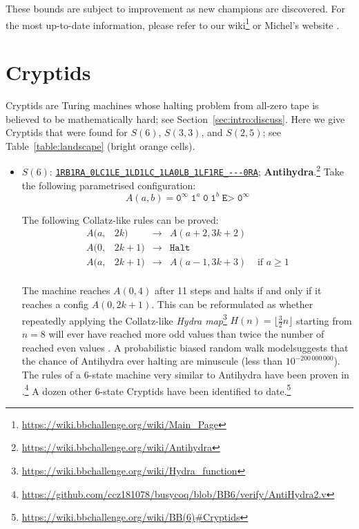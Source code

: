 \documentclass[letterpaper,british,11pt]{article}
\theoremstyle{definition} %
\numberwithin{equation}{section}
\theoremstyle{definition} %
\newcommand{\tm}[1]{\href{https://bbchallenge.org/#1}{\texttt{\nolinkurl{#1}}}}
\newcommand{\szero}{\texttt{0}\xspace}
\newcommand{\sone}{\texttt{1}\xspace}
\begin{document}
These bounds are subject to improvement as new champions are discovered. For the most up-to-date information, please refer to our wiki\footnote{\url{https://wiki.bbchallenge.org/wiki/Main_Page}} or Michel’s website \cite{PMichel_website}.


\section{Cryptids}\label{app:cryptids}

Cryptids are Turing machines whose halting problem from all-zero tape is believed to be mathematically hard; see Section~\ref{sec:intro:discuss}. Here we give Cryptids that were found for $S(6)$, $S(3,3)$, and $S(2,5)$; see Table~\ref{table:landscape} (bright orange cells).

\begin{itemize}
    \item $S(6)$: \tm{1RB1RA_0LC1LE_1LD1LC_1LA0LB_1LF1RE_---0RA}; \textbf{Antihydra}.\footnote{\label{note:antihydra}\url{https://wiki.bbchallenge.org/wiki/Antihydra}} Take the following parametrised configuration:
          $$ A(a,b) = \szero^\infty \; \sone^a \; \szero \; \sone^b \; \texttt{E>} \; \szero^\infty$$

          The following Collatz-like rules can be proved:
          \[
              \begin{array}{llcll}
                  A(a, & 2k)   & \longrightarrow & A(a+2, 3k+2)                         \\
                  A(0, & 2k+1) & \longrightarrow & \texttt{Halt}                        \\
                  A(a, & 2k+1) & \longrightarrow & A(a-1, 3k+3)  & \text{ if } a \geq 1 \\
              \end{array}
          \]

          The machine reaches $A(0,4)$ after 11 steps and halts if and only if it reaches a config $A(0,2k+1)$. This can be reformulated as whether repeatedly applying the Collatz-like \textit{Hydra map}\footnote{\url{https://wiki.bbchallenge.org/wiki/Hydra_function}} $H(n) = \lfloor \frac{3}{2}n\rfloor$ starting from $n=8$ will ever have reached more odd values than twice the number of reached even values \cite{ligocki2024bb6antis}. A probabilistic biased random walk model suggests that the chance of Antihydra ever halting are minuscule (less than $10^{-200\,000\,000}$). The rules of a 6-state machine very similar to Antihydra have been proven in \Coq.\footnote{\url{https://github.com/ccz181078/busycoq/blob/BB6/verify/AntiHydra2.v}} A dozen other 6-state Cryptids have been identified to date.\footnote{\url{https://wiki.bbchallenge.org/wiki/BB(6)\#Cryptids}}



\end{itemize}
\end{document}
